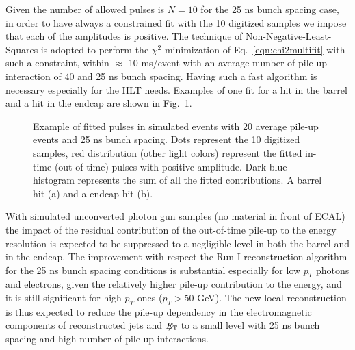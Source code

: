 \documentclass[journal]{IEEEtran}
\newcommand{\ETslash}{\ensuremath{E_{\mathrm{T}}\hspace{-1.1em}/\kern0.45em}}
\begin{document}
Given the number of allowed pulses is $N=10$ for the 25 ns bunch spacing case, in order to have always a constrained fit with the 10 digitized samples we impose that each of the amplitudes is positive. The technique of Non-Negative-Least-Squares \cite{nnls} is adopted to perform the $\chi^2$ minimization of Eq.~\ref{eqn:chi2multifit} with such a constraint, within $\approx$ 10 ms/event with an average number of pile-up interaction of 40 and 25 ns bunch spacing. Having such a fast algorithm is necessary especially for the HLT needs. Examples of one fit for a hit in the barrel and a hit in the endcap are shown in Fig.~\ref{fig:multifits}.
%
\begin{figure}[!t]
  \begin{center}
    \caption{Example of fitted pulses in simulated events with 20 average pile-up events and 25 ns bunch spacing. Dots represent the 10 digitized samples, red distribution (other light colors) represent the fitted in-time (out-of time) pulses with positive amplitude. Dark blue histogram represents the sum of all the fitted contributions. A barrel hit (a) and a endcap hit (b).  \label{fig:multifits} }
  \end{center}
\end{figure}


With simulated unconverted photon gun samples (no material in front of ECAL) the impact of the residual contribution of the out-of-time pile-up to the energy resolution is expected to be suppressed to a negligible level in both the barrel and in the endcap. The improvement with respect the Run I reconstruction algorithm for the 25 ns bunch spacing conditions is substantial especially for low $p_T$ photons and electrons, given the relatively higher pile-up contribution to the energy, and it is still significant for high $p_T$ ones ($p_T>$50 GeV). The new local reconstruction is thus expected to reduce the pile-up dependency in the electromagnetic components of reconstructed jets and $\ETslash$ to a small level with 25 ns bunch spacing and high number of pile-up interactions.
\end{document}

